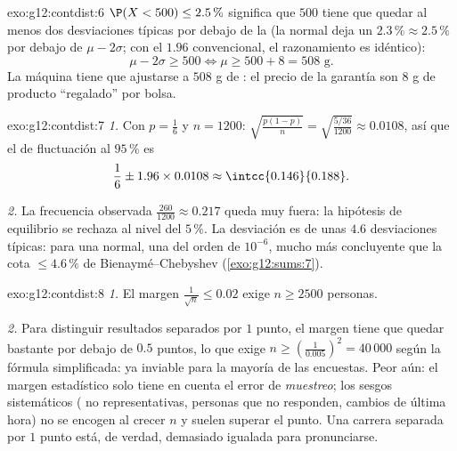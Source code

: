 \begin{solution}{exo:g12:contdist:6}
$\P(X < 500) \leq 2.5\,\%$ significa que $500$ tiene que quedar al menos
dos desviaciones típicas por debajo de la  (la normal deja un
$2.3\,\% \approx 2.5\,\%$ por debajo de $\mu - 2\sigma$; con el $1.96$
convencional, el razonamiento es idéntico):
\[
\mu - 2\sigma \geq 500 \iff \mu \geq 500 + 8 = 508 \text{ g}.
\]
La máquina tiene que ajustarse a $508$ g de : el precio de la
garantía son $8$ g de producto ``regalado'' por bolsa.
\end{solution}

\begin{solution}{exo:g12:contdist:7}
\emph{1.} Con $p = \frac16$ y $n = 1200$:
$\sqrt{\frac{p(1-p)}{n}} = \sqrt{\frac{5/36}{1200}} \approx 0.0108$, así
que el  de fluctuación al $95\,\%$ es
\[
\frac16 \pm 1.96 \times 0.0108 \approx \intcc{0.146}{0.188}.
\]

\emph{2.} La frecuencia observada $\frac{260}{1200} \approx 0.217$ queda
muy fuera: la hipótesis de equilibrio se rechaza al nivel del $5\,\%$. La
desviación es de unas $4.6$ desviaciones típicas: para una 
normal, una  del orden de $10^{-6}$, mucho más concluyente que
la cota $\leq 4.6\,\%$ de Bienaymé--Chebyshev (\cref{exo:g12:sums:7}).
\end{solution}

\begin{solution}{exo:g12:contdist:8}
\emph{1.} El margen $\frac{1}{\sqrt n} \leq 0.02$ exige $n \geq 2500$
personas.

\emph{2.} Para distinguir resultados separados por $1$ punto, el margen
tiene que quedar bastante por debajo de $0.5$ puntos, lo que exige
$n \geq \left(\frac{1}{0.005}\right)^2 = 40\,000$ según la fórmula
simplificada: ya inviable para la mayoría de las encuestas. Peor aún: el
margen estadístico solo tiene en cuenta el error de \emph{muestreo}; los
sesgos sistemáticos ( no representativas, personas que no
responden, cambios de última hora) no se encogen al crecer $n$ y suelen
superar el punto. Una carrera separada por $1$ punto está, de verdad,
demasiado igualada para pronunciarse.
\end{solution}

